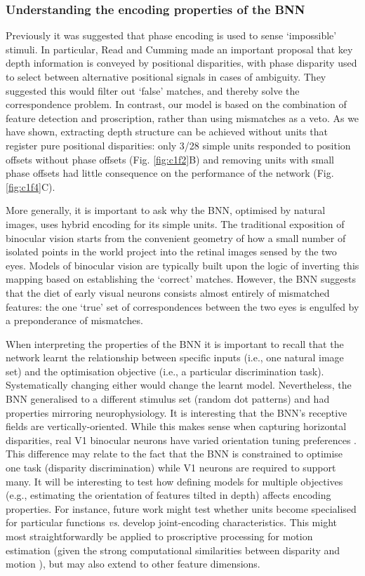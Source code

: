 \subsubsection*{Understanding the encoding properties of the BNN}

Previously it was suggested that phase encoding is used to sense `impossible' stimuli. In particular, Read and Cumming \cite{Read:2007nx} made an important proposal that key depth information is conveyed by positional disparities, with phase disparity used to select between alternative positional signals in cases of ambiguity. They suggested this would filter out `false' matches, and thereby solve the correspondence problem. In contrast, our model is based on the combination of feature detection and proscription, rather than using mismatches as a veto. As we have shown, extracting depth structure can be achieved without units that register pure positional disparities: only 3/28 simple units responded to position offsets without phase offsets (Fig. \ref{fig:c1f2}B) and removing units with small phase offsets had little consequence on the performance of the network (Fig. \ref{fig:c1f4}C). 

More generally, it is important to ask why the BNN, optimised by natural images, uses hybrid encoding for its simple units. The traditional exposition of binocular vision starts from the convenient geometry of how a small number of isolated points in the world project into the retinal images sensed by the two eyes. Models of binocular vision are typically built upon the logic of inverting this mapping based on establishing the `correct' matches. However, the BNN suggests that the diet of early visual neurons consists almost entirely of mismatched features: the one `true' set of correspondences between the two eyes is engulfed by a preponderance of mismatches. 

When interpreting the properties of the BNN it is important to recall that the network learnt the relationship between specific inputs (i.e., one natural image set) and the optimisation objective (i.e., a particular discrimination task). Systematically changing either would change the learnt model. Nevertheless, the BNN generalised to a different stimulus set (random dot patterns) and had properties mirroring neurophysiology. It is interesting that the BNN's receptive fields are vertically-oriented. While this makes sense when capturing horizontal disparities, real V1 binocular neurons have varied orientation tuning preferences \cite{DeAngelis:1991mb}. This difference may relate to the fact that the BNN is constrained to optimise one task (disparity discrimination) while V1 neurons are required to support many. It will be interesting to test how defining models for multiple objectives (e.g., estimating the orientation of features tilted in depth) affects encoding properties. For instance, future work might test whether units become specialised for particular functions {\it vs}. develop joint-encoding characteristics. This might most straightforwardly be applied to proscriptive processing for motion estimation (given the strong computational similarities between disparity and motion \cite{Anzai:2001wi}), but may also extend to other feature dimensions.

